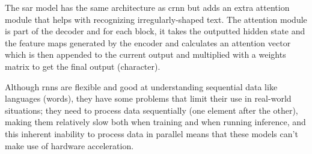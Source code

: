The \gls{sar} model \cite{li_show_2019} has the same architecture as \gls{crnn} but adds an extra attention module that helps with recognizing irregularly-shaped text. The attention module is part of the decoder and for each block, it takes the outputted hidden state and the feature maps generated by the encoder and calculates an attention vector which is then appended to the current output and multiplied with a weights matrix to get the final output (character).

Although \gls{rnn}s are flexible and good at understanding sequential data like languages (words), they have some problems that limit their use in real-world situations; they need to process data sequentially (one element after the other), making them relatively slow both when training and when running inference, and this inherent inability to process data in parallel means that these models can't make use of hardware acceleration.

